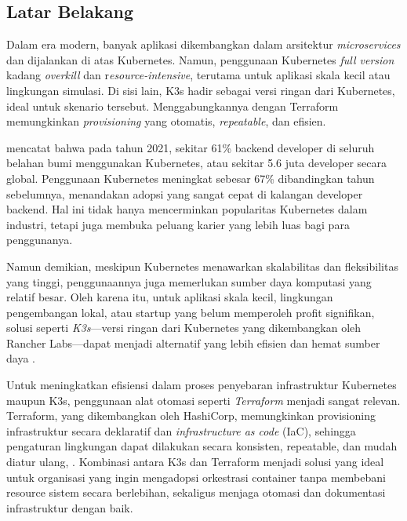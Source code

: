 
\subsection{Latar Belakang}
\sloppy

Dalam era modern, banyak aplikasi dikembangkan dalam arsitektur \textit{microservices} dan dijalankan di atas Kubernetes. 
Namun, penggunaan Kubernetes \textit{full version} kadang \textit{overkill} dan r\textit{esource-intensive}, terutama untuk aplikasi skala 
kecil atau lingkungan simulasi. Di sisi lain, K3s hadir sebagai versi ringan dari Kubernetes, ideal untuk 
skenario tersebut. Menggabungkannya dengan Terraform memungkinkan \textit{provisioning} yang otomatis, \textit{repeatable}, dan efisien.

\cite{CNCF} mencatat bahwa pada tahun 2021, sekitar 61\% backend developer di seluruh belahan bumi menggunakan Kubernetes, atau sekitar 5.6 juta developer secara global. Penggunaan Kubernetes meningkat sebesar 67\% dibandingkan tahun sebelumnya, menandakan adopsi yang sangat cepat di kalangan developer backend. Hal ini tidak hanya mencerminkan popularitas Kubernetes dalam industri, tetapi juga membuka peluang karier yang lebih luas bagi para penggunanya.

Namun demikian, meskipun Kubernetes menawarkan skalabilitas dan fleksibilitas yang tinggi, penggunaannya juga memerlukan sumber daya komputasi yang relatif besar. Oleh karena itu, untuk aplikasi skala kecil, lingkungan pengembangan lokal, atau startup yang belum memperoleh profit signifikan, solusi seperti \textit{K3s}—versi ringan dari Kubernetes yang dikembangkan oleh Rancher Labs—dapat menjadi alternatif yang lebih efisien dan hemat sumber daya \cite{K3s}.

Untuk meningkatkan efisiensi dalam proses penyebaran infrastruktur Kubernetes maupun K3s, penggunaan alat otomasi seperti \textit{Terraform} menjadi sangat relevan. Terraform, yang dikembangkan oleh HashiCorp, memungkinkan provisioning infrastruktur secara deklaratif dan \textit{infrastructure as code} (IaC), sehingga pengaturan lingkungan dapat dilakukan secara konsisten, repeatable, dan mudah diatur ulang, \cite{Terraform}. Kombinasi antara K3s dan Terraform menjadi solusi yang ideal untuk organisasi yang ingin mengadopsi orkestrasi container tanpa membebani resource sistem secara berlebihan, sekaligus menjaga otomasi dan dokumentasi infrastruktur dengan baik.
